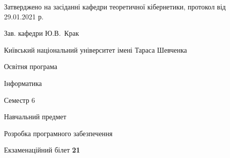 \documentclass[10pt, ukrainian]{article}
\begin{document}
{\vspace{5mm}\smallskip \begin {small} Затверджено на засіданні кафедри теоретичної кібернетики, протокол  від   29.01.2021 р.\par\smallskip\smallskip
{\parbox {6.5 cm}{Зав. кафедри \dotfill Ю.В.~Крак}} \end{small}}
\newpage

{{\begin {small}\par
{ \center  Київський національний університет імені Тараса Шевченка \par}
{\parbox {5 cm}{Освітня програма \hfill}{\parbox {7 cm}{Інформатика \hfill}}\parbox {6 cm}{\hfill Семестр 6}}\par
{\parbox {5 cm} {Навчальний предмет \hfill}\parbox {7 cm}{Розробка програмного забезпечення \hfill}\parbox {6cm}{\hfill}\par}\vspace{-7pt} \end{small}}{\center Екзаменаційний білет \No \textbf
{ 21 }\par}}
\end{document}
